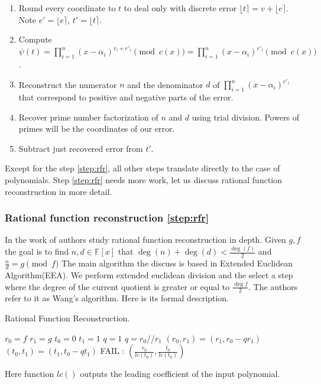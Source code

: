 \documentclass[12pt]{article}
\begin{document}
\begin{enumerate}
    \item Round every coordinate to $t$ to deal only with discrete error $\lfloor t \rceil = v + \lfloor e \rceil$. Note $e' = \lfloor e \rceil$, $t' = \lfloor t \rceil$.
    \item Compute $\psi(t) = \prod_{i=1}^{n}(x - \alpha_{i})^{v_{i} + e'_i} \pmod{c(x)} = \prod_{i=1}^{n}(x - \alpha_{i})^{e'_i} \pmod{c(x)}$.
    \item \label{step:rfr} Reconstruct the numerator $n$ and the denominator $d$ of $\prod_{i=1}^{n}(x - \alpha_{i})^{e'_i}$ that correspond to positive and negative parts of the error.
    \item Recover prime number factorization of $n$ and $d$ using trial division. Powers of primes will be the coordinates of our error.
    \item Subtract just recovered error from $t'$.
\end{enumerate}

Except for the step \ref{step:rfr}, all other steps translate directly to the case of polynomials. Step \ref{step:rfr} needs more work, let us discuss rational function reconstruction in more detail.

\subsubsection{Rational function reconstruction \ref{step:rfr}}
\label{subsubsec:rfr}
In the work of \cite{[KM06]} authors study rational function reconstruction in depth.  Given $g,f$ the goal is to find $n, d \in \mathbb{F}[x]$ that $\deg(n) + \deg(d) < \frac{\deg(f)}{2}$ and $\frac{n}{d} = g \pmod{f}$ The main algorithm the discuss is based in Extended Euclidean Algorithm(EEA). We perform extended euclidean division and the select a step where the degree of the current quotient is greater or equal to $\frac{\deg f}{2}$. The authors refer to it as Wang's algorithm. Here is its formal description.

\begin{algorithm}
\caption{Rational Function Reconstruction.}\label{RFR}
\begin{algorithmic}[1]
    \State $r_0 = f$  $r_1 = g$
    \State $t_0 = 0$  $t_1 = 1$
    \State $q = 1$
        \State $q = r_0 // r_1$
        \State $(r_0, r_1) = (r_1, r_0 - qr_1)$
        \State $(t_0, t_1) = (t_1, t_0 - qt_1)$
    \EndWhile
        \State \Return FAIL
    \Else:
            \State \Return  $(\frac{r_0}{lc(t_0)}, \frac{t_0}{lc(t_0)})$
    \EndIf
\EndProcedure
\end{algorithmic}
\end{algorithm}
Here function $lc()$ outputs the leading coefficient of the input polynomial.
\end{document}
